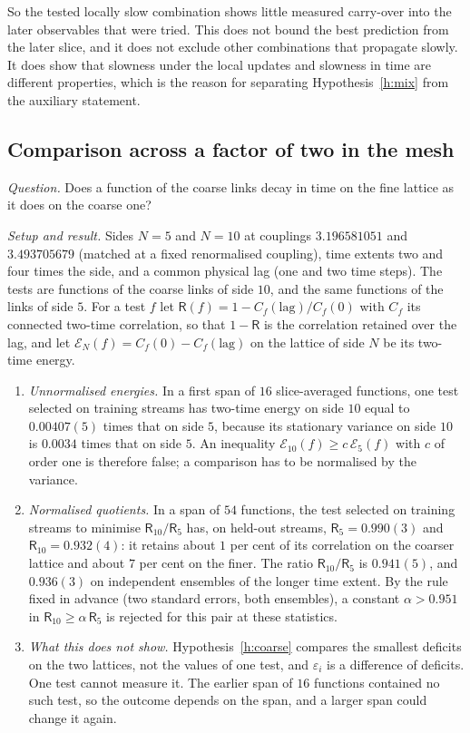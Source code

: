 So the tested locally slow combination shows little measured carry-over into the later observables that were
tried. This does not bound the best prediction from the later slice, and it does not exclude other
combinations that propagate slowly. It does show that slowness under the local updates and slowness in time
are different properties, which is the reason for separating Hypothesis~\ref{h:mix} from the auxiliary
statement.

\subsection{Comparison across a factor of two in the mesh}\label{s:cross}
\emph{Question.} Does a function of the coarse links decay in time on the fine lattice as it does on the
coarse one?

\emph{Setup and result.} Sides $N=5$ and $N=10$ at couplings $3.196581051$ and $3.493705679$ (matched at a
fixed renormalised coupling), time extents two and four times the side, and a common physical
lag (one and two time steps). The tests are functions of the coarse links of side $10$, and the same
functions of the links of side $5$. For a test $f$ let $\mathsf R(f)=1-C_f(\mathrm{lag})/C_f(0)$ with $C_f$ its
connected two-time correlation, so that $1-\mathsf R$ is the correlation retained over the lag, and let
$\mathcal E_N(f)=C_f(0)-C_f(\mathrm{lag})$ on the lattice of side $N$ be its two-time energy.
\begin{enumerate}
\item \emph{Unnormalised energies.} In a first span of $16$ slice-averaged functions, one test selected on
training streams has two-time energy on side $10$ equal to $0.00407(5)$ times that on side $5$, because its
stationary variance on side $10$ is $0.0034$ times that on side $5$. An inequality
$\mathcal E_{10}(f)\ge c\,\mathcal E_5(f)$ with $c$ of order one is therefore false; a comparison has to be
normalised by the variance.
\item \emph{Normalised quotients.} In a span of $54$ functions, the test selected on training streams to
minimise $\mathsf R_{10}/\mathsf R_5$ has, on held-out streams, $\mathsf R_5=0.990(3)$ and
$\mathsf R_{10}=0.932(4)$: it retains about $1$ per cent of its correlation on the coarser lattice and about
$7$ per cent on the finer. The ratio $\mathsf R_{10}/\mathsf R_5$ is $0.941(5)$, and $0.936(3)$ on independent
ensembles of the longer time extent. By the rule fixed in advance (two standard errors, both ensembles), a
constant $\alpha>0.951$ in $\mathsf R_{10}\ge\alpha\,\mathsf R_5$ is rejected for this pair at these statistics.
\item \emph{What this does not show.} Hypothesis~\ref{h:coarse} compares the smallest deficits on the two
lattices, not the values of one test, and $\varepsilon_i$ is a difference of deficits. One test cannot measure
it. The earlier span of $16$ functions contained no such test, so the outcome depends on the span, and a
larger span could change it again.
\end{enumerate}

